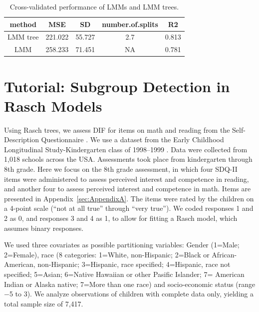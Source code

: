 \documentclass[doc,floatsintext,natbib]{apa7}
\begin{document}
\begin{table}

\caption{\label{tab:performance}Cross-validated performance of LMMs and LMM trees.}
\begin{tabular}[t]{ccccc}
\toprule
method & MSE & SD & number.of.splits & R2\\
\midrule
LMM tree & 221.022 & 55.727 & 2.7 & 0.813\\
LMM & 258.233 & 71.451 & NA & 0.781\\
\bottomrule
\end{tabular}
\end{table}





\newpage
\FloatBarrier
\section{Tutorial: Subgroup Detection in Rasch Models}
\label{sec:TutorialRasch}

Using Rasch trees, we assess DIF for items on math and reading  from the Self-Description Questionnaire \cite{Boyl94}. We use a dataset from the Early Childhood Longitudinal Study-Kindergarten class of 1998--1999 \citep[ECLS-K; ][]{NCES10}. Data were collected from 1,018 schools across the USA. Assessments took place from kindergarten through 8th grade. Here we focus on the 8th grade assessment, in which four SDQ-II items were administered to assess perceived interest and competence in reading, and another four to assess perceived interest and competence in math. Items are presented in Appendix~\ref{sec:AppendixA}. The items were rated by the children on a 4-point scale (“not at all true” through “very true”). We coded responses 1 and 2 as 0, and responses 3 and 4 as 1, to allow for fitting a Rasch model, which assumes binary responses. 


We used three covariates as possible partitioning variables: Gender (1=Male; 2=Female), race (8 categories: 1=White, non-Hispanic; 2=Black or African-American, non-Hispanic; 3=Hispanic, race specified; 4=Hispanic, race not specified; 5=Asian; 6=Native Hawaiian or other Pasific Islander; 7= American Indian or Alaska native; 7=More than one race) and socio-economic status (range $-$5 to 3).  We analyze observations of children with complete data only, yielding a total sample size of 7,417.
\end{document}
